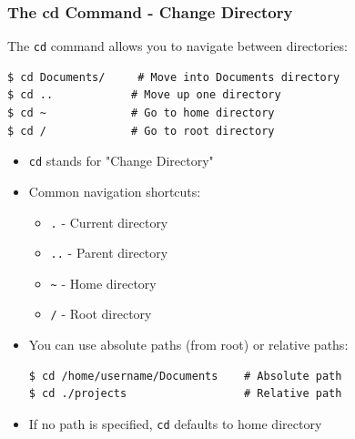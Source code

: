 \documentclass[10pt]{beamer}
\begin{document}
\begin{frame}[fragile]
    \frametitle{The cd Command - Change Directory}
    The \colorbox{gray!20}{\texttt{cd}} command allows you to navigate between directories:
\begin{verbatim}
$ cd Documents/     # Move into Documents directory
$ cd ..            # Move up one directory
$ cd ~             # Go to home directory
$ cd /             # Go to root directory
\end{verbatim}
    \begin{itemize}
        \item \colorbox{gray!20}{\texttt{cd}} stands for "Change Directory"
        \item Common navigation shortcuts:
        \begin{itemize}
            \item \colorbox{gray!20}{\texttt{.}} - Current directory
            \item \colorbox{gray!20}{\texttt{..}} - Parent directory
            \item \colorbox{gray!20}{\texttt{\textasciitilde}} - Home directory
            \item \colorbox{gray!20}{\texttt{/}} - Root directory
        \end{itemize}
        \item You can use absolute paths (from root) or relative paths:
\begin{verbatim}
$ cd /home/username/Documents    # Absolute path
$ cd ./projects                  # Relative path
\end{verbatim}
        \item If no path is specified, \colorbox{gray!20}{\texttt{cd}} defaults to home directory
    \end{itemize}
\end{frame}
\end{document}
